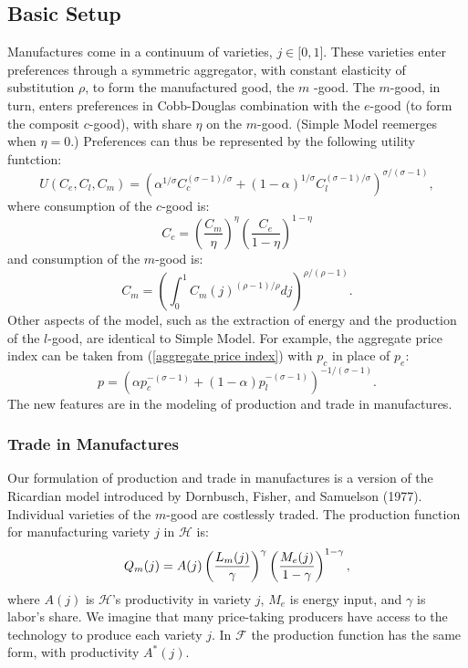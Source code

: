 \documentclass[notitlepage,12pt]{article}
\begin{document}
\subsection{Basic Setup}

Manufactures come in a continuum of varieties, $j\in \lbrack 0,1]$. These
varieties enter preferences through a symmetric aggregator, with constant
elasticity of substitution $\rho $, to form the manufactured good, the $m$%
-good. The $m$-good, in turn, enters preferences in Cobb-Douglas combination
with the $e$-good (to form the composit $c$-good), with share $\eta $ on the 
$m$-good. (Simple Model reemerges when $\eta =0$.) Preferences can thus be
represented by the following utility funtction:%
\begin{equation}
U(C_{e},C_{l},C_{m})=\left( \alpha ^{1/\sigma }C_{c}^{(\sigma -1)/\sigma
}+\left( 1-\alpha \right) ^{1/\sigma }C_{l}^{(\sigma -1)/\sigma }\right)
^{\sigma /(\sigma -1)},  \label{Utility}
\end{equation}%
where consumption of the $c$-good is:%
\begin{equation*}
C_{c}=\left( \frac{C_{m}}{\eta }\right) ^{\eta }\left( \frac{C_{e}}{1-\eta }%
\right) ^{1-\eta }
\end{equation*}%
and consumption of the $m$-good is:%
\begin{equation*}
C_{m}=\left( \int_{0}^{1}C_{m}(j)^{\left( \rho -1\right) /\rho }dj\right)
^{\rho /\left( \rho -1\right) }.
\end{equation*}%
Other aspects of the model, such as the extraction of energy and the
production of the $l$-good, are identical to Simple Model. For example, the
aggregate price index can be taken from (\ref{aggregate price index}) with $%
p_{c}$ in place of $p_{e}$:%
\begin{equation}
p=\left( \alpha p_{c}^{-(\sigma -1)}+(1-\alpha )p_{l}^{-(\sigma -1)}\right)
^{-1/(\sigma -1)}.  \label{aggregate price index II}
\end{equation}%
The new features are in the modeling of production and trade in manufactures.

\subsubsection{Trade in Manufactures}

Our formulation of production and trade in manufactures is a version of the
Ricardian model introduced by Dornbusch, Fisher, and Samuelson (1977).
Individual varieties of the $m$-good are costlessly traded. The production
function for manufacturing variety $j$ in $\mathcal{H}$ is:%
\begin{equation*}
Q_{m}(j)=A(j)\left( \frac{L_{m}(j)}{\gamma }\right) ^{\gamma }\left( \frac{%
M_{e}(j)}{1-\gamma }\right) ^{1-\gamma },
\end{equation*}%
where $A(j)$ is $\mathcal{H}$'s productivity in variety $j$, $M_{e}$ is
energy input, and $\gamma $ is labor's share. We imagine that many
price-taking producers have access to the technology to produce each variety 
$j$. In $\mathcal{F}$ the production function has the same form, with
productivity $A^{\ast }(j)$.
\end{document}
